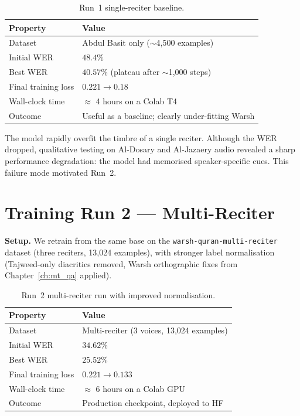\begin{table}[H]
  \centering
  \caption{Run~1 single-reciter baseline.}
  \label{tab:mt_run1}
  \renewcommand{\arraystretch}{1.3}
  \begin{tabular}{ll}
    \toprule
    \textbf{Property} & \textbf{Value} \\
    \midrule
    Dataset                     & Abdul Basit only ($\sim$4{,}500 examples) \\
    Initial WER                 & $48.4\%$ \\
    Best WER                    & $40.57\%$ (plateau after $\sim$1{,}000 steps) \\
    Final training loss         & $0.221 \rightarrow 0.18$ \\
    Wall-clock time             & $\approx$ 4 hours on a Colab T4 \\
    Outcome                     & Useful as a baseline; clearly under-fitting Warsh \\
    \bottomrule
  \end{tabular}
\end{table}

The model rapidly overfit the timbre of a single reciter. Although the
WER dropped, qualitative testing on Al-Dosary and Al-Jazaery audio
revealed a sharp performance degradation: the model had memorised
speaker-specific cues. This failure mode motivated Run~2.

\section{Training Run 2 --- Multi-Reciter}
\label{sec:mt_run2}

\textbf{Setup.} We retrain from the same base on the
\texttt{warsh-quran-multi-reciter} dataset (three reciters,
13{,}024 examples), with stronger label normalisation (Tajweed-only
diacritics removed, Warsh orthographic fixes from
Chapter~\ref{ch:mt_qa} applied).

\begin{table}[H]
  \centering
  \caption{Run~2 multi-reciter run with improved normalisation.}
  \label{tab:mt_run2}
  \renewcommand{\arraystretch}{1.3}
  \begin{tabular}{ll}
    \toprule
    \textbf{Property} & \textbf{Value} \\
    \midrule
    Dataset                     & Multi-reciter (3 voices, 13{,}024 examples) \\
    Initial WER                 & $34.62\%$ \\
    Best WER                    & $\mathbf{25.52\%}$ \\
    Final training loss         & $0.221 \rightarrow 0.133$ \\
    Wall-clock time             & $\approx$ 6 hours on a Colab GPU \\
    Outcome                     & Production checkpoint, deployed to HF \\
    \bottomrule
  \end{tabular}
\end{table}

